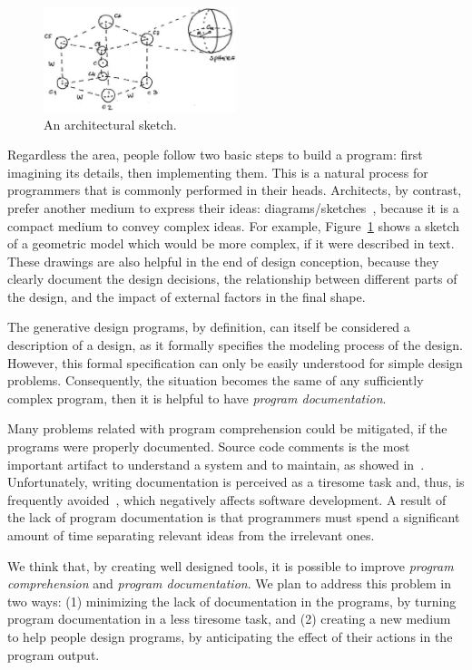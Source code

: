 \begin{figure}[h]
	\centering
    \includegraphics[width=0.5\textwidth]{images/cube-sketch}
    \caption{An architectural sketch.}
    \label{fig:sketch}
\end{figure}

Regardless the area, people follow two basic steps to build a program: first imagining its details, then implementing them. This is a natural process for programmers that is commonly performed in their heads. Architects, by contrast, prefer another medium to express their ideas: diagrams/sketches~\citep{do2001thinking}, because it is a compact medium to convey complex ideas. For example, Figure~\ref{fig:sketch} shows a sketch of a geometric model which would be more complex, if it were described in text. These drawings are also helpful in the end of design conception, because they clearly document the design decisions, the relationship between different parts of the design, and the impact of external factors in the final shape.

The generative design programs, by definition, can itself be considered a description of a design, as it formally specifies the modeling process of the design. However, this formal specification can only be easily understood for simple design problems. Consequently, the situation becomes the same of any sufficiently complex program, then it is helpful to have \textit{program documentation}.

Many problems related with program comprehension could be mitigated, if the programs were properly documented. Source code comments is the most important artifact to understand a system and to maintain, as showed in~\citep{de2005study}. Unfortunately, writing documentation is perceived as a tiresome task and, thus, is frequently avoided~\citep{sousa1998survey}, which negatively affects software development. A result of the lack of program documentation is that programmers must spend a significant amount of time separating relevant ideas from the irrelevant ones.

We think that, by creating well designed tools, it is possible to improve \textit{program comprehension} and \textit{program documentation}. We plan to address this problem in two ways: (1) minimizing the lack of documentation in the programs, by turning program documentation in a less tiresome task, and (2) creating a new medium to help people design programs, by anticipating the effect of their actions in the program output.

